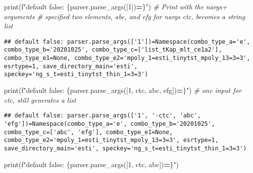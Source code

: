\documentclass[
]{book}
\newenvironment{Shaded}{\begin{snugshade}}{\end{snugshade}}
\newcommand{\BuiltInTok}[1]{#1}
\newcommand{\CommentTok}[1]{\textcolor[rgb]{0.56,0.35,0.01}{\textit{#1}}}
\newcommand{\NormalTok}[1]{#1}
\newcommand{\OperatorTok}[1]{\textcolor[rgb]{0.81,0.36,0.00}{\textbf{#1}}}
\newcommand{\SpecialCharTok}[1]{\textcolor[rgb]{0.00,0.00,0.00}{#1}}
\newcommand{\SpecialStringTok}[1]{\textcolor[rgb]{0.31,0.60,0.02}{#1}}
\newcommand{\StringTok}[1]{\textcolor[rgb]{0.31,0.60,0.02}{#1}}
\begin{document}
\begin{Shaded}
\begin{Highlighting}[]
\BuiltInTok{print}\NormalTok{(}\SpecialStringTok{f"default false: }\SpecialCharTok{\{}\NormalTok{parser}\SpecialCharTok{.}\NormalTok{parse\_args([}\StringTok{\textquotesingle{}1\textquotesingle{}}\NormalTok{])}\OperatorTok{=}\SpecialCharTok{\}}\SpecialStringTok{"}\NormalTok{)}
\CommentTok{\# Print with the nargs+ arguments}
\CommentTok{\# specified two elements, abc, and efg for nargs ctc, becomes a string list}
\end{Highlighting}
\end{Shaded}

\begin{verbatim}
## default false: parser.parse_args(['1'])=Namespace(combo_type_a='e', combo_type_b='20201025', combo_type_c=['list_tKap_mlt_ce1a2'], combo_type_e1=None, combo_type_e2='mpoly_1=esti_tinytst_mpoly_13=3=3', esrtype=1, save_directory_main='esti', speckey='ng_s_t=esti_tinytst_thin_1=3=3')
\end{verbatim}

\begin{Shaded}
\begin{Highlighting}[]
\BuiltInTok{print}\NormalTok{(}\SpecialStringTok{f"default false: }\SpecialCharTok{\{}\NormalTok{parser}\SpecialCharTok{.}\NormalTok{parse\_args([}\StringTok{\textquotesingle{}1\textquotesingle{}}\NormalTok{, }\StringTok{\textquotesingle{}{-}ctc\textquotesingle{}}\NormalTok{, }\StringTok{\textquotesingle{}abc\textquotesingle{}}\NormalTok{, }\StringTok{\textquotesingle{}efg\textquotesingle{}}\NormalTok{])}\OperatorTok{=}\SpecialCharTok{\}}\SpecialStringTok{"}\NormalTok{)}
\CommentTok{\# one input for ctc, still generates a list}
\end{Highlighting}
\end{Shaded}

\begin{verbatim}
## default false: parser.parse_args(['1', '-ctc', 'abc', 'efg'])=Namespace(combo_type_a='e', combo_type_b='20201025', combo_type_c=['abc', 'efg'], combo_type_e1=None, combo_type_e2='mpoly_1=esti_tinytst_mpoly_13=3=3', esrtype=1, save_directory_main='esti', speckey='ng_s_t=esti_tinytst_thin_1=3=3')
\end{verbatim}

\begin{Shaded}
\begin{Highlighting}[]
\BuiltInTok{print}\NormalTok{(}\SpecialStringTok{f"default false: }\SpecialCharTok{\{}\NormalTok{parser}\SpecialCharTok{.}\NormalTok{parse\_args([}\StringTok{\textquotesingle{}1\textquotesingle{}}\NormalTok{, }\StringTok{\textquotesingle{}{-}ctc\textquotesingle{}}\NormalTok{, }\StringTok{\textquotesingle{}abc\textquotesingle{}}\NormalTok{])}\OperatorTok{=}\SpecialCharTok{\}}\SpecialStringTok{"}\NormalTok{)}
\end{Highlighting}
\end{Shaded}
\end{document}
